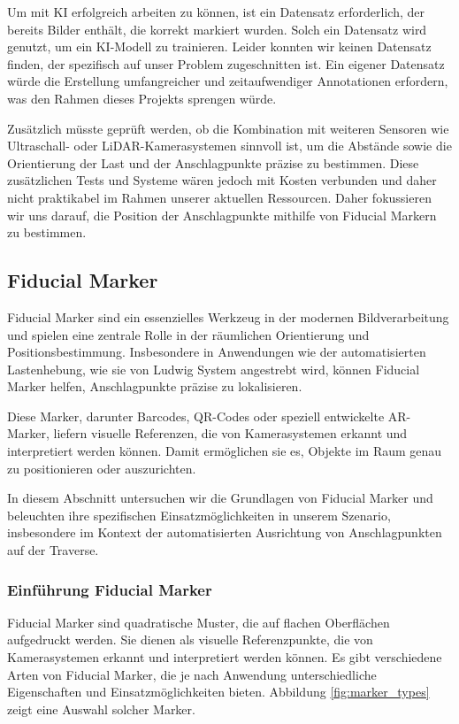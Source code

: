 Um mit KI erfolgreich arbeiten zu können, ist ein Datensatz erforderlich, der bereits Bilder enthält, die korrekt markiert wurden. Solch ein Datensatz
wird genutzt, um ein KI-Modell zu trainieren. Leider konnten wir keinen Datensatz finden, der spezifisch auf unser Problem zugeschnitten ist. Ein eigener
Datensatz würde die Erstellung umfangreicher und zeitaufwendiger Annotationen erfordern, was den Rahmen dieses Projekts sprengen würde.

Zusätzlich müsste geprüft werden, ob die Kombination mit weiteren Sensoren wie Ultraschall- oder LiDAR-Kamerasystemen sinnvoll ist, um die Abstände sowie 
die Orientierung der Last und der Anschlagpunkte präzise zu bestimmen. Diese zusätzlichen Tests und Systeme wären jedoch mit Kosten verbunden und daher nicht praktikabel 
im Rahmen unserer aktuellen Ressourcen. Daher fokussieren wir uns darauf, die Position der Anschlagpunkte mithilfe von Fiducial Markern zu bestimmen.

\subsection{Fiducial Marker}
Fiducial Marker sind ein essenzielles Werkzeug in der modernen Bildverarbeitung und spielen eine 
zentrale Rolle in der räumlichen Orientierung und Positionsbestimmung. Insbesondere in Anwendungen 
wie der automatisierten Lastenhebung, wie sie von Ludwig System angestrebt wird, können Fiducial Marker 
helfen, Anschlagpunkte präzise zu lokalisieren.

Diese Marker, darunter Barcodes, QR-Codes oder speziell entwickelte AR-Marker, liefern visuelle 
Referenzen, die von Kamerasystemen erkannt und interpretiert werden können. Damit ermöglichen sie es, 
Objekte im Raum genau zu positionieren oder auszurichten.

In diesem Abschnitt untersuchen wir die Grundlagen von Fiducial Marker und beleuchten ihre spezifischen 
Einsatzmöglichkeiten in unserem Szenario, insbesondere im Kontext der automatisierten Ausrichtung von 
Anschlagpunkten auf der Traverse.

\subsubsection{Einführung Fiducial Marker}
Fiducial Marker sind quadratische Muster, die auf flachen Oberflächen aufgedruckt werden. 
Sie dienen als visuelle Referenzpunkte, die von Kamerasystemen erkannt und interpretiert 
werden können. Es gibt verschiedene Arten von Fiducial Marker, die je nach Anwendung 
unterschiedliche Eigenschaften und Einsatzmöglichkeiten bieten. 
Abbildung \ref{fig:marker_types} zeigt eine Auswahl solcher Marker.

